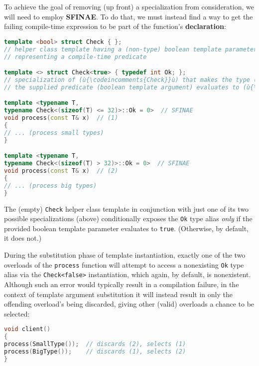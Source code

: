 To achieve the goal of removing (up
front) a specialization from consideration, we will need to employ
\textbf{SFINAE}. To do that, we must instead find a way to get the
failing compile-time expression to be part of the function's
\textbf{declaration}:

\begin{lstlisting}[language=C++]
template <bool> struct Check { };
// helper class template having a (non-type) boolean template parameter
// representing a compile-time predicate

template <> struct Check<true> { typedef int Ok; };
// specialization of (ù{\codeincomments{Check}}ù) that makes the type (ù{\codeincomments{Ok}}ù) manifest *only* if
// the supplied predicate (boolean template argument) evaluates to (ù{\codeincomments{true}}ù)

template <typename T,
typename Check<(sizeof(T) <= 32)>::Ok = 0>  // SFINAE
void process(const T& x)  // (1)
{
// ... (process small types)
}

template <typename T,
typename Check<(sizeof(T) > 32)>::Ok = 0>  // SFINAE
void process(const T& x)  // (2)
{
// ... (process big types)
}
\end{lstlisting}

\noindent The (empty) \texttt{Check} helper class template in conjunction with
just one of its two possible specializations (above) conditionally
exposes the \texttt{Ok} type alias \emph{only} if the provided boolean
template parameter evaluates to \texttt{true}. (Otherwise, by default, it
does not.)

During the substitution phase of template instantiation,
exactly one of the two overloads of the \texttt{process} function will
attempt to access a nonexisting \texttt{Ok} type alias via the
\texttt{Check<false>} instantiation, which again, by default, is
nonexistent. Although such an error would typically result in a
compilation failure, in the context of template argument substitution it
will instead result in only the offending overload's being discarded,
giving other (valid) overloads a chance to be selected:

\begin{lstlisting}[language=C++]
void client()
{
process(SmallType());  // discards (2), selects (1)
process(BigType());    // discards (1), selects (2)
}
\end{lstlisting}

